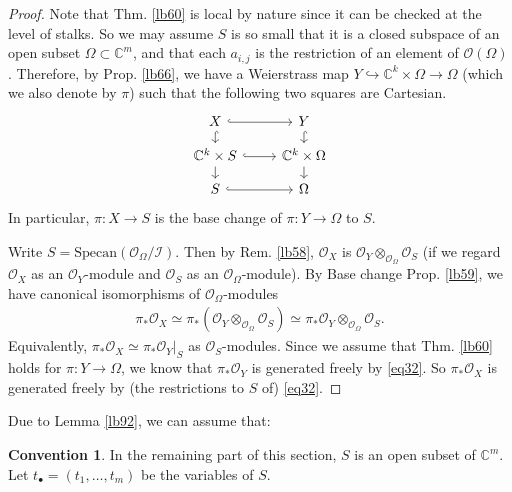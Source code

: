 \documentclass[12pt,b5paper,notitlepage]{report}
\theoremstyle{definition}
\newtheorem{cv}[df]{Convention}
\theoremstyle{plain}
\newcommand{\mc}{\mathcal}
\newcommand{\scr}{\mathscr}
\newcommand{\blt}{\bullet}
\newcommand{\Cbb}{\mathbb C}
\newcommand{\Specan}{\mathrm{Specan}}
\numberwithin{equation}{section}
\begin{document}
\begin{proof}
Note that Thm. \ref{lb60} is local by nature since it can be checked at the level of stalks. So we may assume $S$ is so small that it is a closed subspace of an open subset $\Omega\subset\Cbb^m$, and that each $a_{i,j}$ is the restriction of an element of $\scr O(\Omega)$. Therefore, by Prop. \ref{lb66}, we have a Weierstrass map $Y\hookrightarrow \Cbb^k\times\Omega\rightarrow\Omega$ (which we also denote by $\pi$) such that the following two squares are Cartesian.
\begin{equation*}
\begin{tikzcd}[row sep=small]
X \arrow[d, hook] \arrow[r, hook]              & Y \arrow[d, hook]            \\
\Cbb^k\times S \arrow[r, hook] \arrow[d] & \Cbb^k\times\Omega \arrow[d] \\
S \arrow[r, hook]                        & \Omega                      
\end{tikzcd}
\end{equation*}
In particular, $\pi:X\rightarrow S$ is the base change of $\pi:Y\rightarrow\Omega$ to $S$. 

Write $S=\Specan(\scr O_\Omega/\mc I)$. Then by Rem. \ref{lb58}, $\scr O_X$ is $\scr O_Y\otimes_{\scr O_\Omega}\scr O_S$ (if we regard $\scr O_X$ as an $\scr O_Y$-module and $\scr O_S$ as an $\scr O_\Omega$-module). By Base change Prop. \ref{lb59}, we have canonical isomorphisms of $\scr O_\Omega$-modules
\begin{align*}
\pi_*\scr O_X\simeq\pi_*(\scr O_Y\otimes_{\scr O_\Omega}\scr O_S)\simeq \pi_*\scr O_Y\otimes_{\scr O_\Omega}\scr O_S.
\end{align*}
Equivalently, $\pi_*\scr O_X\simeq\pi_*\scr O_Y|_S$ as $\scr O_S$-modules. Since we assume that Thm. \ref{lb60} holds for $\pi:Y\rightarrow \Omega$, we know that $\pi_*\scr O_Y$ is generated freely by \eqref{eq32}. So $\pi_*\scr O_X$ is generated freely by (the restrictions to $S$ of) \eqref{eq32}.
\end{proof}




Due to Lemma \ref{lb92}, we can assume that:
\begin{cv}
In the remaining part of this section, $S$ is an open subset of $\Cbb^m$. Let $t_\blt=(t_1,\dots,t_m)$ be the variables of $S$.
\end{cv}
\end{document}
